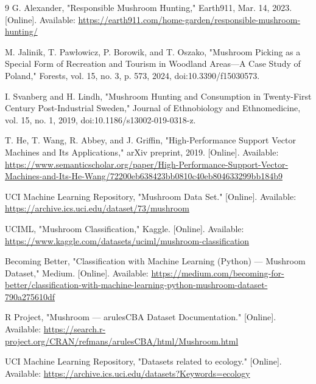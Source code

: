 \documentclass[conference]{IEEEtran}
\begin{document}
\begin{thebibliography}{9}
 G. Alexander, "Responsible Mushroom Hunting," Earth911, Mar. 14, 2023. [Online]. Available: \url{https://earth911.com/home-garden/responsible-mushroom-hunting/}

 M. Jalinik, T. Paw\l{}owicz, P. Borowik, and T. Oszako, "Mushroom Picking as a Special Form of Recreation and Tourism in Woodland Areas—A Case Study of Poland," Forests, vol. 15, no. 3, p. 573, 2024, doi:10.3390/f15030573.

 I. Svanberg and H. Lindh, "Mushroom Hunting and Consumption in Twenty-First Century Post-Industrial Sweden," Journal of Ethnobiology and Ethnomedicine, vol. 15, no. 1, 2019, doi:10.1186/s13002-019-0318-z.

 T. He, T. Wang, R. Abbey, and J. Griffin, "High-Performance Support Vector Machines and Its Applications," arXiv preprint, 2019. [Online]. Available: \url{https://www.semanticscholar.org/paper/High-Performance-Support-Vector-Machines-and-Its-He-Wang/72200eb638423bb0810c40eb804633299bb184b9}

 UCI Machine Learning Repository, "Mushroom Data Set." [Online]. Available: \url{https://archive.ics.uci.edu/dataset/73/mushroom}

 UCIML, "Mushroom Classification," Kaggle. [Online]. Available: \url{https://www.kaggle.com/datasets/uciml/mushroom-classification}

 Becoming Better, "Classification with Machine Learning (Python) — Mushroom Dataset," Medium. [Online]. Available: \url{https://medium.com/becoming-for-better/classification-with-machine-learning-python-mushroom-dataset-790a275610df}

 R Project, "Mushroom — arulesCBA Dataset Documentation." [Online]. Available: \url{https://search.r-project.org/CRAN/refmans/arulesCBA/html/Mushroom.html}

 UCI Machine Learning Repository, "Datasets related to ecology." [Online]. Available: \url{https://archive.ics.uci.edu/datasets?Keywords=ecology}
\end{thebibliography}
\end{document}
